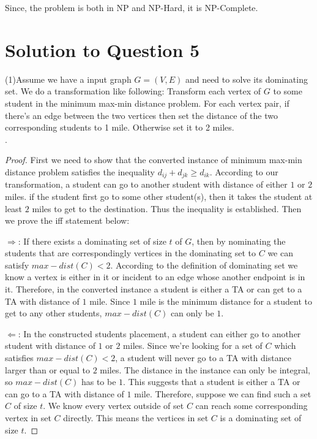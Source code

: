 \documentclass[11pt]{article}
\begin{document}
   Since, the problem is both in NP and NP-Hard, it is NP-Complete.

\newpage
\section{Solution to Question 5} 
(1)Assume we have a input graph $G = (V, E)$ and need to solve its dominating set.
We do a transformation like following: Transform each vertex of $G$ to some student in the minimum max-min distance problem.
For each vertex pair, if there's an edge between the two vertices then set the distance of the two corresponding students to 1 mile.
Otherwise set it to 2 miles. \\

.

\begin{proof}
	First we need to show that the converted instance of minimum max-min distance problem satisfies the inequality $d_{ij} + d_{jk} \geq d_{ik}$.
	According to our transformation, a student can go to another student with distance of either $1$ or $2$ miles.
	if the student first go to some other student(s), then it takes the student at least $2$ miles to get to the destination.
	Thus the inequality is established.
	Then we prove the iff statement below:

	$\Rightarrow$: If there exists a dominating set of size $t$ of $G$, then by nominating the students that are correspondingly vertices in the dominating set to $C$ we can satisfy $max-dist(C) < 2$. 
	According to the definition of dominating set we know a vertex is either in it or incident to an edge whose another endpoint is in it.
	Therefore, in the converted instance a student is either a TA or can get to a TA with distance of $1$ mile.
	Since $1$ mile is the minimum distance for a student to get to any other students, $max-dist(C)$ can only be $1$.

	$\Leftarrow$: In the constructed students placement, a student can either go to another student with distance of $1$ or $2$ miles.
	Since we're looking for a set of $C$ which satisfies $max-dist(C) < 2$, a student will never go to a TA with distance larger than or equal to $2$ miles.
	The distance in the instance can only be integral, so $max-dist(C)$ has to be $1$.
	This suggests that a student is either a TA or can go to a TA with distance of $1$ mile.
	Therefore, suppose we can find such a set $C$ of size $t$.
	We know every vertex outside of set $C$ can reach some corresponding vertex in set $C$ directly.
	This means the vertices in set $C$ is a dominating set of size $t$.
\end{proof}
\end{document}
